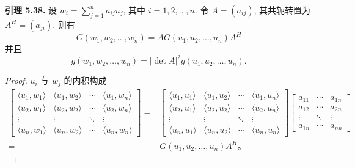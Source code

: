 \documentclass[a4paper]{ctexart}
\begin{document}
{\noindent \textbf{引理 5.38.} 设 $w_i = \sum_{j=1}^n a_{ij} u_j$, 其中 $i = 1, 2, \ldots, n$. 
令 $A = (a_{ij})$, 其共轭转置为 $A^H = (\overline{a_{ji}})$. 则有
\[
  G(w_1, w_2, \ldots, w_n) = A G(u_1, u_2, \ldots, u_n) A^H
\]
并且
\[
  g(w_1, w_2, \ldots, w_n) = |\det A|^2 g(u_1, u_2, \ldots, u_n).
\]

\begin{proof}
$u_i$ 与 $w_j$ 的内积构成
\begin{align*}
\begin{bmatrix}
\langle u_1, w_1 \rangle & \langle u_1, w_2 \rangle & \cdots & \langle u_1, w_n \rangle \\
\langle u_2, w_1 \rangle & \langle u_2, w_2 \rangle & \cdots & \langle u_2, w_n \rangle \\
\vdots & \vdots & \ddots & \vdots \\
\langle u_n, w_1 \rangle & \langle u_n, w_2 \rangle & \cdots & \langle u_n, w_n \rangle
\end{bmatrix}
= &\begin{bmatrix}
\langle u_1, u_1 \rangle & \langle u_1, u_2 \rangle & \cdots & \langle u_1, u_n \rangle \\
\langle u_2, u_1 \rangle & \langle u_2, u_2 \rangle & \cdots & \langle u_2, u_n \rangle \\
\vdots & \vdots & \ddots & \vdots \\
\langle u_n, u_1 \rangle & \langle u_n, u_2 \rangle & \cdots & \langle u_n, u_n \rangle
\end{bmatrix} 
\begin{bmatrix}
a_{11} & \cdots & a_{1n} \\
a_{12} & \cdots & a_{2n} \\
\vdots & \ddots & \vdots \\
a_{1n} & \cdots & a_{nn}
\end{bmatrix} \\
=& G(u_1, u_2, \ldots, u_n) A^H。
\end{align*}


\end{proof}}
\end{document}
